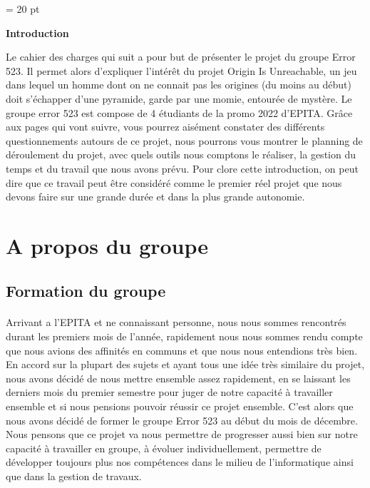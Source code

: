 \documentclass[12pt,a4paper]{article}
\begin{document}
\pagestyle{fancy}
\thispagestyle{empty}
\baselineskip = 20 pt
\newpage
{}

\begin{center}
\begin{Large}
\textbf{Introduction}
\end{Large}
\end{center}
  Le cahier des charges qui suit a pour but de présenter le projet du groupe Error 523.
Il permet alors d'expliquer l'intérêt du projet Origin Is Unreachable, un jeu dans lequel un homme dont
on ne connait pas les origines (du moins au début) doit s'échapper d'une pyramide, garde par une
momie, entourée de mystère.
Le groupe error 523 est compose de 4 étudiants de la promo 2022 d’EPITA.
Grâce aux pages qui vont suivre, vous pourrez aisément constater des différents questionnements
autours de ce projet, nous pourrons vous montrer le planning de déroulement du projet, avec quels
outils nous comptons le réaliser, la gestion du temps et du travail que nous avons prévu.
Pour clore cette introduction, on peut dire que ce travail peut être considéré comme le premier réel
projet que nous devons faire sur une grande durée et dans la plus grande autonomie.
\newpage
\thispagestyle{empty}
\tableofcontents

\newpage
\section {A propos du groupe}
\subsection{Formation du groupe}
\paragraph{}
Arrivant a l'EPITA et ne connaissant personne, nous nous sommes rencontrés durant les premiers mois de l'année, rapidement nous nous sommes rendu compte que nous avions des affinités en communs et que nous nous entendions très bien. En accord sur la plupart des sujets et ayant tous une idée très similaire du projet, nous avons décidé de nous mettre ensemble assez rapidement, en se laissant les derniers mois du premier semestre pour juger de notre capacité à travailler ensemble et si nous pensions pouvoir réussir ce projet ensemble. C'est alors que nous avons décidé de former le groupe Error 523 au début du mois de décembre. Nous pensons que ce projet va nous permettre de progresser aussi bien sur notre capacité à travailler en groupe, à évoluer individuellement, permettre de développer toujours plus nos compétences dans le milieu de l'informatique ainsi que dans la gestion de travaux.
\end{document}
